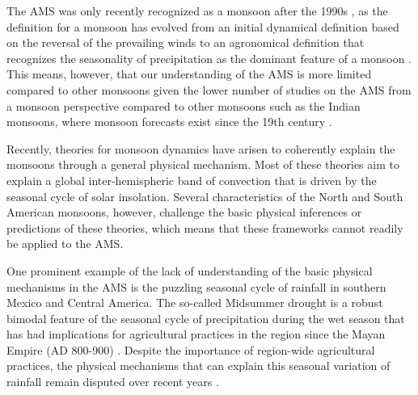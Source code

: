 The AMS was only recently recognized as a monsoon after the 1990s , as the definition for a monsoon has evolved from an initial dynamical definition based on the reversal of the prevailing winds to an agronomical definition that recognizes the seasonality of precipitation as the dominant feature of a monsoon \citep{wang2017,gadgil2018}. This  means, however, that our understanding of the AMS is more limited compared to other monsoons given the lower number of studies on the AMS from a monsoon perspective compared to other monsoons such as the Indian monsoons, where monsoon forecasts exist since the 19th century \citep{blanford}.


Recently, theories for monsoon dynamics \citep{bordoni2008monsoons,biasutti2018global,hill2019,geen2020} have arisen to coherently explain the monsoons through a general physical mechanism. Most of these theories aim to explain a global inter-hemispheric band of convection that is driven by the seasonal cycle of solar insolation. Several characteristics of the North and South American monsoons, however, challenge the basic physical inferences or predictions of these theories, which means that these frameworks cannot readily  be applied to the AMS.


One prominent example of the lack of understanding of the basic physical mechanisms in the AMS is the puzzling seasonal cycle of rainfall in southern Mexico and Central America. The so-called Midsummer drought is a robust bimodal feature of the seasonal cycle of precipitation during the wet season that has had implications for agricultural practices in the region since the Mayan Empire (AD 800-900) \citep{jobbova2018ritual}. Despite the importance of region-wide agricultural practices, the physical mechanisms that can explain this seasonal variation of rainfall remain disputed over recent years \citep{karnauskas2013,herrera2015,zermeno2019}. 

